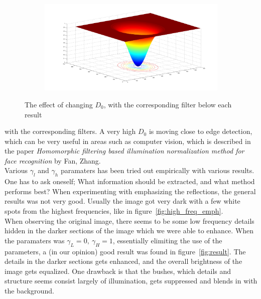 \documentclass[a4paper]{article}
\begin{document}
\begin{figure}[h!]
\begin{subfigure}[b]{0.6\textwidth}
				\caption{}
				\label{fig:low_sigma_filter}
			\end{subfigure}%
			\begin{subfigure}[b]{0.6\textwidth}
				\includegraphics[width=\textwidth]{../pics/high_sigma_filter.png}
				\caption{}
				\label{fig:high_sigma_filter}
			\end{subfigure}
			\label{fig:sigma}
		\caption{The effect of changing $D_0$, with the corresponding filter below each result}				
		\end{figure}
		with the corresponding filters. A very high $D_0$ is moving close to edge detection,
		which can be very useful in areas such as computer vision, which is described in 
		the paper \emph{Homomorphic filtering based illumination normalization 
		method for face recognition} by Fan, Zhang.
		\\
		Various $\gamma_l$ and $\gamma_h$ paramaters has been tried out empirically with 
		various results. One has to ask oneself; What information should be extracted, and what 
		method performs best? When experimenting with emphasizing the reflections, the 
		general results was not very good. Usually the image got very dark with a few white
		spots from the highest frequencies, like in figure~\ref{fig:high_freq_emph}.
		\\
		When observing the original image, there seems to be some 
		low frequency details hidden in the darker sections of the image which we were able
		to enhance. When the paramaters was $\gamma_L = 0,~\gamma_H = 1$,
		essentially elimiting the use of the parameters, a (in our opinion) good result was 
		found in figure~\ref{fig:result}. The details in the darker sections gets enhanced, 
		and the overall brightness
		of the image gets equalized. One drawback is that the bushes, which details 
		and structure seems consist
		largely of illumination, gets suppressed and blends in with the background.\\
\end{document}
